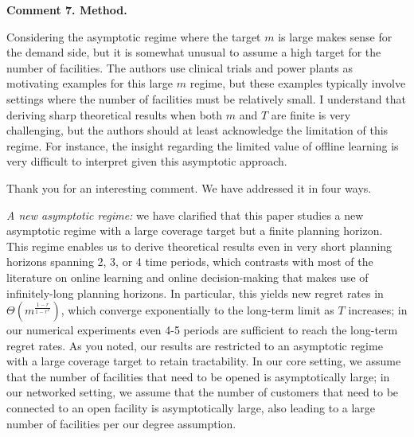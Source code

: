 \documentclass[11pt]{article}
\begin{document}
\begin{commentBox}
\textbf{Comment 7. Method.}\label{R1:7}

    Considering the asymptotic regime where the target $m$ is large makes sense for the demand side, but it is somewhat unusual to assume a high target for the number of facilities. The authors use clinical trials and power plants as motivating examples for this large $m$ regime, but these examples typically involve settings where the number of facilities must be relatively small. I understand that deriving sharp theoretical results when both $m$ and $T$ are finite is very challenging, but the authors should at least acknowledge the limitation of this regime. For instance, the insight regarding the limited value of offline learning is very difficult to interpret given this asymptotic approach.
\end{commentBox}

Thank you for an interesting comment. We have addressed it in four ways.

\textit{A new asymptotic regime:}
we have clarified that this paper studies a new asymptotic regime with a large coverage target but a finite planning horizon. This regime enables us to derive theoretical results even in very short planning horizons spanning 2, 3, or 4 time periods, which contrasts with most of the literature on online learning and online decision-making that makes use of infinitely-long planning horizons. In particular, this yields new regret rates in $\Theta\left(m^{\frac{1-r}{1-r^T}}\right)$, which converge exponentially to the long-term limit as $T$ increases; in our numerical experiments even 4-5 periods are sufficient to reach the long-term regret rates. As you noted, our results are restricted to an asymptotic regime with a large coverage target to retain tractability. In our core setting, we assume that the number of facilities that need to be opened is asymptotically large; in our networked setting, we assume that the number of customers that need to be connected to an open facility is asymptotically large, also leading to a large number of facilities per our degree assumption.
\end{document}
